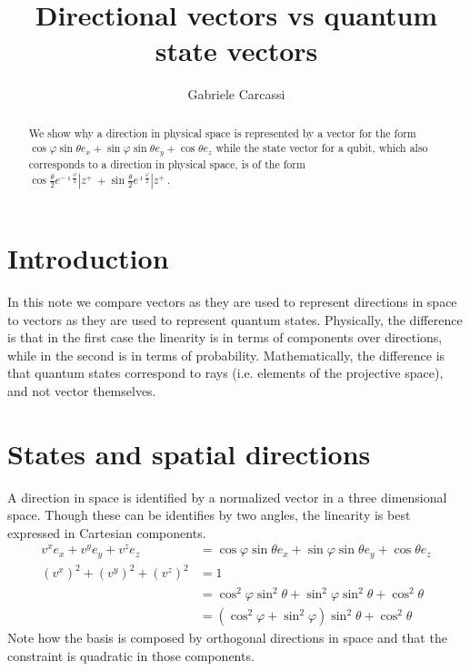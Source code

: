 \documentclass{techbrief}
\title{Directional vectors vs quantum state vectors}
\author{Gabriele Carcassi}
\begin{document}
\maketitle
	
\begin{abstract}
	We show why a direction in physical space is represented by a vector for the form $\cos \varphi \sin \theta e_x + \sin \varphi \sin \theta e_y + \cos \theta e_z$ while the state vector for a qubit, which also corresponds to a direction in physical space, is of the form $\cos \frac{\theta}{2} e^{-\imath \frac{\varphi}{2}} | z^+ \> + \sin \frac{\theta}{2} e^{\imath \frac{\varphi}{2}} | z^+ \>$.
\end{abstract}
	
\section{Introduction}

In this note we compare vectors as they are used to represent directions in space to vectors as they are used to represent quantum states. Physically, the difference is that in the first case the linearity is in terms of components over directions, while in the second is in terms of probability. Mathematically, the difference is that quantum states correspond to rays (i.e. elements of the projective space), and not vector themselves.

\section{States and spatial directions}

A direction in space is identified by a normalized vector in a three dimensional space. Though these can be identifies by two angles, the linearity is best expressed in Cartesian components.
\begin{equation}
	\begin{aligned}
		v^x e_x + v^y e_y + v^z e_z &= \cos \varphi \sin \theta e_x + \sin \varphi \sin \theta e_y + \cos \theta e_z \\
		(v^x)^2 + (v^y)^2 + (v^z)^2 &= 1 \\
		&= \cos^2 \varphi \sin^2 \theta + \sin^2 \varphi \sin^2 \theta + \cos^2 \theta \\
		&= ( \cos^2 \varphi + \sin^2 \varphi ) \sin^2 \theta + \cos^2 \theta
	\end{aligned}
\end{equation}
Note how the basis is composed by orthogonal directions in space and that the constraint is quadratic in those components.
\end{document}
